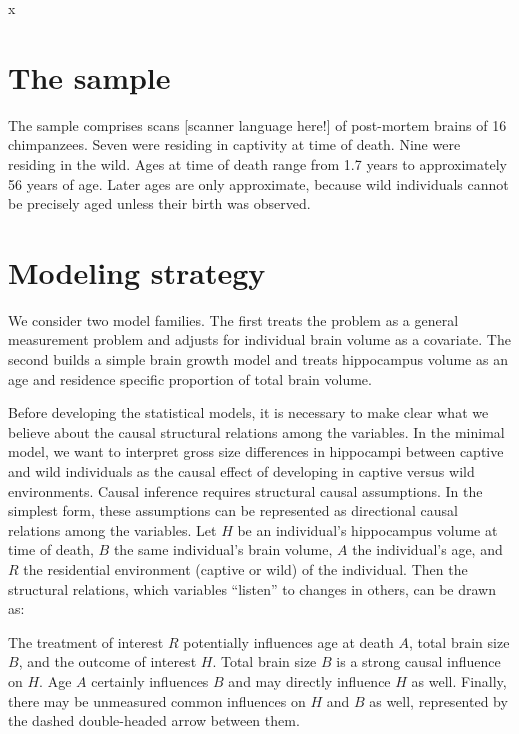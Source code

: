 \documentclass[reqno ,11pt]{amsart}
\begin{document}
x

\section{The sample}

The sample comprises scans [scanner language here!] of post-mortem brains of 16 chimpanzees. Seven were residing in captivity at time of death. Nine were residing in the wild. Ages at time of death range from 1.7 years to approximately 56 years of age. Later ages are only approximate, because wild individuals cannot be precisely aged unless their birth was observed.

\section{Modeling strategy}

We consider two model families. The first treats the problem as a general measurement problem and adjusts for individual brain volume as a covariate. The second builds a simple brain growth model and treats hippocampus volume as an age and residence specific proportion of total brain volume.

Before developing the statistical models, it is necessary to make clear what we believe about the causal structural relations among the variables. In the minimal model, we want to interpret gross size differences in hippocampi between captive and wild individuals as the causal effect of developing in captive versus wild environments. Causal inference requires structural causal assumptions. In the simplest form, these assumptions can be represented as directional causal relations among the variables. Let $H$ be an individual's hippocampus volume at time of death, $B$ the same individual's brain volume, $A$ the individual's age, and $R$ the residential environment (captive or wild) of the individual. Then the structural relations, which variables ``listen'' to changes in others, can be drawn as:
\begin{center}
\end{center}
The treatment of interest $R$ potentially influences age at death $A$, total brain size $B$, and the outcome of interest $H$. Total brain size $B$ is a strong causal influence on $H$. Age $A$ certainly influences $B$ and may directly influence $H$ as well. Finally, there may be unmeasured common influences on $H$ and $B$ as well, represented by the dashed double-headed arrow between them.
\end{document}
